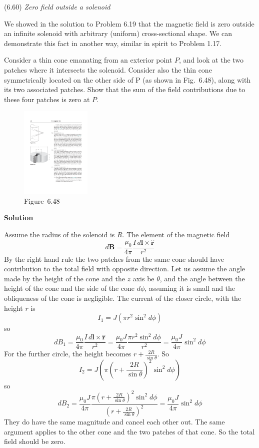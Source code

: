 \documentclass{article}
\begin{document}
\begin{homeworkProblem}
	(6.60) \textit{Zero field outside a solenoid}

	We showed in the solution to Problem 6.19 that the magnetic field is zero outside an infinite solenoid with arbitrary (uniform) cross-sectional shape. We can demonstrate this fact in another way, similar in spirit to Problem 1.17.

	Consider a thin cone emanating from an exterior point $P$, and look at the two patches where it intersects the solenoid. Consider also the thin cone symmetrically located on the other side of P (as shown in Fig.~6.48), along with its two associated patches. Show that the sum of the field contributions due to these four patches is zero at $P$.
	\begin{figure}[H]
		\centering
		\includegraphics[width = 0.3\textwidth]{6_48.pdf}
		\caption*{Figure~6.48}
	\end{figure}

	\textbf{Solution}

	Assume the radius of the solenoid is $R$. The element of the magnetic field
	\[
		d\mathbf{B}=\frac{\mu_0}{4\pi}\frac{I\,d\mathbf{l}\times\hat{\mathbf{r}}}{r^2}
	\]
	By the right hand rule the two patches from the same cone should have contribution to the total field with opposite direction. Let us assume the angle made by the height of the cone and the $z$ axis be $\theta$, and the angle between the height of the cone and the side of the cone $d\phi$, assuming it is small and the obliqueness of the cone is negligible. The current of the closer circle, with the height $r$ is
	\[
		I_1=J(\pi r^2\sin^2d\phi)
	\]
	so
	\[
		dB_1=\frac{\mu_0}{4\pi}\frac{I\,d\mathbf{l}\times\hat{\mathbf{r}}}{r^2}=\frac{\mu_0J}{4\pi}\frac{\pi r^2\sin^2d\phi}{r^2}=\frac{\mu_0J}{4\pi}\sin^2d\phi
	\]
	For the further circle, the height becomes $r+\frac{2R}{\sin\theta}$. So
	\[
		I_2=J\left(\pi\left(r+\frac{2R}{\sin\theta}\right)^2\sin^2d\phi\right)
	\]
	so
	\[
		dB_2=\frac{\mu_0J}{4\pi}\frac{\pi\left(r+\frac{2R}{\sin\theta}\right)^2\sin^2d\phi}{\left(r+\frac{2R}{\sin\theta}\right)^2}=\frac{\mu_0J}{4\pi}\sin^2d\phi
	\]
	They do have the same magnitude and cancel each other out. The same argument applies to the other cone and the two patches of that cone. So the total field should be zero.
\end{homeworkProblem}
\end{document}
